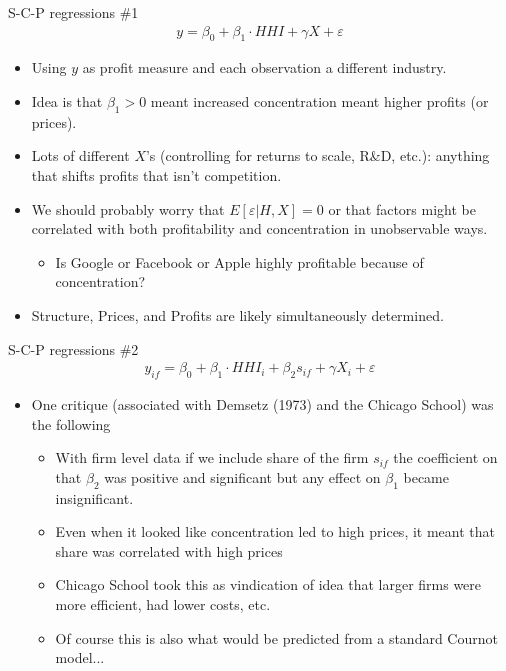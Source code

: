 \documentclass[xcolor=pdftex,dvipsnames,table,mathserif]{beamer}
\begin{document}
\begin{frame}{S-C-P regressions \#1}
\begin{eqnarray*}
y = \beta_0 + \beta_1 \cdot HHI + \gamma X +  \varepsilon
\end{eqnarray*}

\begin{itemize}
\item Using $y$ as profit measure and each observation a different industry.
\item Idea is that $\beta_1 > 0$ meant increased concentration meant higher profits (or prices).
\item Lots of different $X$'s (controlling for returns to scale, R\&D, etc.): anything that shifts profits that isn't competition.
\item We should probably worry that $E[\varepsilon | H, X ] = 0$ or that factors might be correlated with both profitability and concentration in unobservable ways.
\begin{itemize}
\item Is Google or Facebook or Apple highly profitable because of concentration?
\end{itemize}
\item Structure, Prices, and Profits are likely simultaneously determined.
\end{itemize}
\end{frame}

\begin{frame}{S-C-P regressions \#2}
\begin{eqnarray*}
y_{if} = \beta_0 + \beta_1 \cdot HHI_i + \beta_2 s_{if} +  \gamma X_{i} +  \varepsilon
\end{eqnarray*}
\begin{itemize}
\item One critique (associated with Demsetz (1973) and the Chicago School) was the following
\begin{itemize}
\item With firm level data if we include share of the firm $s_{if}$ the coefficient on that $\beta_2$ was positive and significant but any effect on $\beta_1$ became insignificant.
\item Even when it looked like concentration led to high prices, it meant that share was correlated with high prices
\item Chicago School took this as vindication of idea that larger firms were more efficient, had lower costs, etc.
\item Of course this is also what would be predicted from a standard Cournot model...
\end{itemize}
\end{itemize}
\end{frame}
\end{document}
